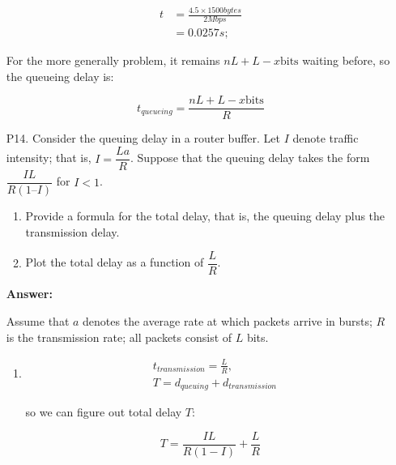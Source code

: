 \begin{enumerate}
	\begin{equation*}
		\begin{split}
			t & = \frac{4.5 \times 1500 bytes}{2 Mbps} \\ 
			  & = 0.0257 s;
		\end{split}
	\end{equation*}
		
	For the more generally problem, it remains $n L + L - x \text{bits}$ waiting before, so the queueing delay is:
	
	$$
		t_{queueing} = \dfrac{n L + L - x \text{bits}}{R}
	$$
	
	\item[P14.] Consider the queuing delay in a router buffer. Let $ I $ denote traffic intensity; that is, $ I = \dfrac{La}{R} $. Suppose that the queuing delay takes the form $ \dfrac{IL}{R (1 – I)} $ for $ I < 1 $.
	
	\begin{enumerate}
    	\item Provide a formula for the total delay, that is, the queuing delay plus the transmission delay.
    	
    	\item Plot the total delay as a function of $\dfrac{L}{R}$.
	\end{enumerate}
	
	\textbf{Answer:}
	
	Assume that $a$ denotes the average rate at which packets arrive in bursts; $R$ is the transmission rate; all packets consist of $L$ bits.
	\begin{enumerate}
	    \item 
	    
		\begin{equation*}
			\begin{split}
				& t_{transmission} = \frac{L}{R}, \\
				& T = d_{queuing} + d_{transmission}
			\end{split}
		\end{equation*}
		
		so we can figure out total delay $T$:
		
		\begin{equation}
		    \label{eq:1}
            T = \frac{I L}{R (1 - I)} + \frac{L}{R} 
		\end{equation}
			

\end{enumerate}
\end{enumerate}
